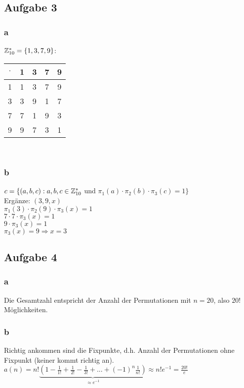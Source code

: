 \subsection{Aufgabe 3}

\subsubsection{a} $\mathbb{Z}_{10}^* =\{1,3,7,9\}$:
\begin{tabular}{|c|c|c|c|c|}
\hline $\cdot$ & 1 & 3 & 7 & 9 \\ 
\hline 1 & 1 & 3 & 7 & 9 \\ 
\hline 3 & 3 & 9 & 1 & 7 \\ 
\hline 7 & 7 & 1 & 9 & 3 \\ 
\hline 9 & 9 & 7 & 3 & 1 \\
\hline 
\end{tabular} 
\\
\subsubsection{b} $c=\{(a,b,c):a,b,c \in \mathbb{Z}_{10}^* $ und $\pi_1(a) \cdot  \pi_2(b) \cdot  \pi_3(c)=1\}$\\
Ergänze: $(3,9,x)$\\
$\pi_1(3) \cdot  \pi_2(9) \cdot  \pi_3(x)=1$\\
$7\cdot 7\cdot \pi_3(x)=1$\\
$9\cdot \pi_3(x)=1$\\
$\pi_3(x)=9 \Rightarrow x=3$

\subsection{Aufgabe 4}

\subsubsection{a} Die Gesamtzahl entspricht der Anzahl der Permutationen mit $n=20$, also $20!$ Möglichkeiten. 

\subsubsection{b} Richtig ankommen sind die Fixpunkte, d.h. Anzahl der Permutationen ohne Fixpunkt (keiner kommt richtig an).\\
$a(n)=n!\underbrace{(1-\frac{1}{1!}+\frac{1}{2!}-\frac{1}{3!}+...+(-1)^n \frac{1}{n!})}_{\approx e^{-1}} \approx n! e^{-1}= \frac{20!}{e}$


